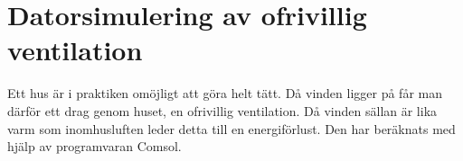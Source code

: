 \section{Datorsimulering av ofrivillig ventilation}

Ett hus är i praktiken omöjligt att göra helt tätt. Då vinden ligger på får man därför ett drag genom huset, en ofrivillig ventilation. Då vinden sällan är lika varm som inomhusluften leder detta till en energiförlust. Den har beräknats med hjälp av programvaran Comsol.

